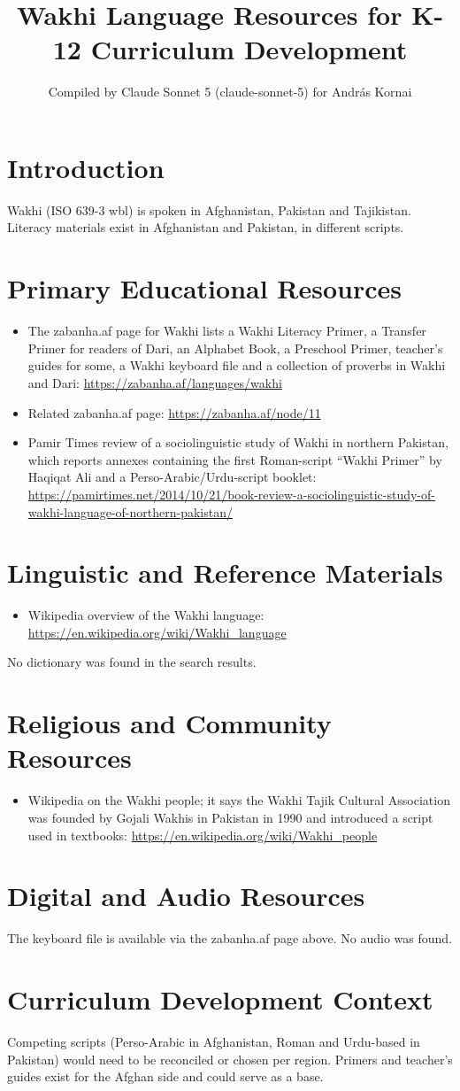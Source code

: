 \documentclass[12pt]{article}
\title{Wakhi Language Resources for K-12 Curriculum Development}
\author{Compiled by Claude Sonnet 5 (claude-sonnet-5) for Andr\'as Kornai}
\date{}
\begin{document}
\maketitle
\section{Introduction}
Wakhi (ISO 639-3 wbl) is spoken in Afghanistan, Pakistan and Tajikistan. Literacy materials exist in Afghanistan and Pakistan, in different scripts.
\section{Primary Educational Resources}
\begin{itemize}
\item The zabanha.af page for Wakhi lists a Wakhi Literacy Primer, a Transfer Primer for readers of Dari, an Alphabet Book, a Preschool Primer, teacher's guides for some, a Wakhi keyboard file and a collection of proverbs in Wakhi and Dari: \url{https://zabanha.af/languages/wakhi}
\item Related zabanha.af page: \url{https://zabanha.af/node/11}
\item Pamir Times review of a sociolinguistic study of Wakhi in northern Pakistan, which reports annexes containing the first Roman-script ``Wakhi Primer'' by Haqiqat Ali and a Perso-Arabic/Urdu-script booklet: \url{https://pamirtimes.net/2014/10/21/book-review-a-sociolinguistic-study-of-wakhi-language-of-northern-pakistan/}
\end{itemize}
\section{Linguistic and Reference Materials}
\begin{itemize}
\item Wikipedia overview of the Wakhi language: \url{https://en.wikipedia.org/wiki/Wakhi_language}
\end{itemize}
No dictionary was found in the search results.
\section{Religious and Community Resources}
\begin{itemize}
\item Wikipedia on the Wakhi people; it says the Wakhi Tajik Cultural Association was founded by Gojali Wakhis in Pakistan in 1990 and introduced a script used in textbooks: \url{https://en.wikipedia.org/wiki/Wakhi_people}
\end{itemize}
\section{Digital and Audio Resources}
The keyboard file is available via the zabanha.af page above. No audio was found.
\section{Curriculum Development Context}
Competing scripts (Perso-Arabic in Afghanistan, Roman and Urdu-based in Pakistan) would need to be reconciled or chosen per region. Primers and teacher's guides exist for the Afghan side and could serve as a base.
\end{document}
